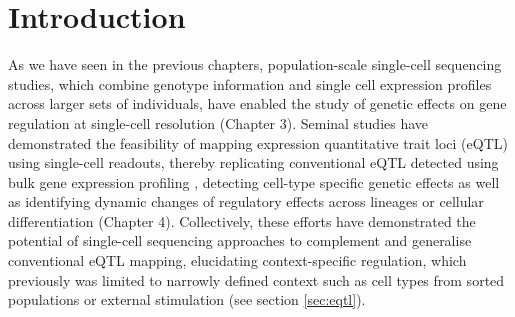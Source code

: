 \newpage





\section{Introduction} 

As we have seen in the previous chapters, population-scale single-cell sequencing studies, which combine genotype information and single cell expression profiles across larger sets of individuals, have enabled the study of genetic effects on gene regulation at single-cell resolution (Chapter 3). 
Seminal studies have demonstrated the feasibility of mapping expression quantitative trait loci (eQTL) using single-cell readouts, thereby replicating conventional eQTL detected using bulk gene expression profiling \cite{cuomo2020single, van2018single}, detecting cell-type specific genetic effects \cite{van2018single} as well as identifying dynamic changes of regulatory effects across lineages or cellular differentiation \cite{cuomo2020single} (Chapter 4). 
Collectively, these efforts have demonstrated the potential of single-cell sequencing approaches to complement and generalise conventional eQTL mapping, elucidating context-specific regulation, which previously was limited to narrowly defined context such as cell types from sorted populations \cite{fairfax2012genetics} or external stimulation \cite{fairfax2014innate} (see section \ref{sec:eqtl}).\\


